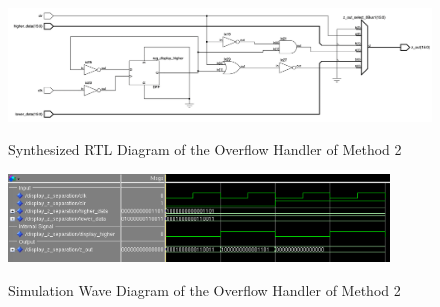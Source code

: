 \begin{figure}[!ht]
	\centering
	\caption{Synthesized RTL Diagram of the Overflow Handler of Method 2}
	\includegraphics[width=\textwidth]{../img/sep_display_rtl.png}
	\label{fig:sep_display_rtl}
\end{figure}

\begin{figure}[!ht]
	\centering
	\caption{Simulation Wave Diagram of the Overflow Handler of Method 2}
	\includegraphics[width=0.9\textwidth]{../img/sep_display_sim.png}
	\label{fig:sep_display_sim}
\end{figure}